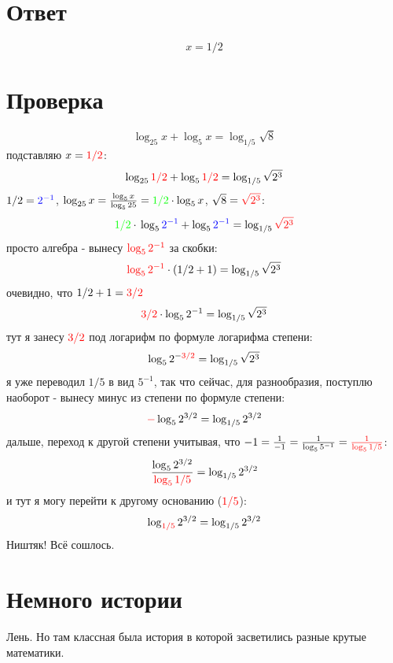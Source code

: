 \documentclass{article}
\begin{document}
\section{Ответ}
$$x = 1/2$$

\section{Проверка}
$$\log_{25}{x}+\log_{5}{x}=\log_{1/5}{\sqrt{8}}$$
подставляю $x = \color{red}1/2$:
$$\log_{25}{\color{red}1/2}+\log_{5}{\color{red}1/2}=\log_{1/5}{\sqrt{2^3}}$$
$1/2=\color{blue}2^{-1}$, $\log_{25}{x}=\frac{\log_{5}{x}}{\log_5{25}}={\color{green}1/2}\cdot\log_{5}{x}$, $\sqrt{8}=\color{red}\sqrt{2^3}$:
$${\color{green}1/2}\cdot{}\log_{5}{\color{blue}2^{-1}}+\log_{5}{\color{blue}2^{-1}}=\log_{1/5}{\color{red}\sqrt{2^3}}$$
просто алгебра - вынесу $\color{red}\log_{5}{2^{-1}}$ за скобки:
$${\color{red}\log_{5}{2^{-1}}}\cdot(1/2+1)=\log_{1/5}{\sqrt{2^3}}$$
очевидно, что $1/2+1=\color{red}3/2$
$${\color{red}3/2}\cdot\log_{5}{2^{-1}}=\log_{1/5}{\sqrt{2^3}}$$
тут я занесу $\color{red}3/2$ под логарифм по формуле логарифма степени:
$$\log_{5}{2^{-\color{red}3/2}}=\log_{1/5}{\sqrt{2^3}}$$
я уже переводил $1/5$ в вид $5^{-1}$, так что сейчас, для разнообразия, поступлю наоборот - вынесу минус из степени по формуле степени:
$${\color{red}-}\log_{5}{2^{3/2}}=\log_{1/5}{2^{3/2}}$$
дальше, переход к другой степени учитывая, что $-1=\frac{1}{-1}=\frac{1}{\log_{5}{5^{-1}}}=\color{red}\frac{1}{\log_{5}{1/5}}$:
$$\frac{\log_{5}{2^{3/2}}}{\color{red}\log_{5}{1/5}}=\log_{1/5}{2^{3/2}}$$
и тут я могу перейти к другому основанию ($\color{red}1/5$):
$$\log_{\color{red}1/5}{2^{3/2}}=\log_{1/5}{2^{3/2}}$$
Ништяк! Всё сошлось.

\section{Немного истории}
Лень. Но там классная была история в которой засветились разные крутые математики.
\end{document}
